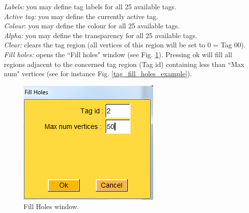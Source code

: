\textit{Labels:} you may define tag labels for all 25 available tags.\\
\textit{Active tag:} you may define the currently active tag.\\
\textit{Colour}: you may define the colour for all 25 available tags.\\
\textit{Alpha:} you may define the transparency for all 25 available tags.\\
\textit{Clear:} clears the tag region (all vertices of this region will be set to 0 = Tag 00).
\textit{Fill holes:} opens the ``Fill holes" window (see Fig. \ref{fill_holes_window}). Pressing ok will fill all regions adjacent to the concerned tag region (Tag id) containing less than ``Max num" vertices (see for instance Fig. \ref{tag_fill_holes_example}).
\begin{figure}
  \centering
  \includegraphics[scale=0.5]{images/Tags/Fill Holes.png} 
	\caption{Fill Holes window.}
\label{fill_holes_window}
 \end{figure}

